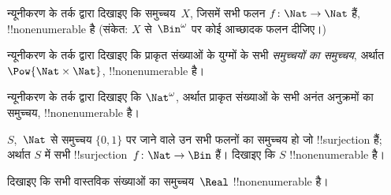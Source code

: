 \documentclass[../../../include/open-logic-section]{subfiles}
\begin{document}
\begin{prob}\label{sfr:siz:red-alt:prob:nat-nat}
  न्यूनीकरण के तर्क द्वारा दिखाइए कि समुच्चय~$X$, जिसमें सभी फलन
  $f\colon \Nat \to \Nat$ हैं, !!{nonenumerable} है (संकेत: $X$
  से~$\Bin^\omega$ पर कोई आच्छादक फलन दीजिए।)
\end{prob}

\begin{prob}
न्यूनीकरण के तर्क द्वारा दिखाइए कि प्राकृत संख्याओं के युग्मों के सभी
\emph{समुच्चयों का समुच्चय}, अर्थात $\Pow{\Nat \times \Nat}$,
!!{nonenumerable} है।
\end{prob}

\begin{prob}
न्यूनीकरण के तर्क द्वारा दिखाइए कि $\Nat^\omega$, अर्थात प्राकृत संख्याओं
के सभी अनंत अनुक्रमों का समुच्चय, !!{nonenumerable} है।
\end{prob}


\begin{prob}
$S$,~$\Nat$ से समुच्चय $\{0,1\}$ पर जाने वाले उन सभी फलनों का समुच्चय हो
जो !!{surjection} हैं; अर्थात $S$ में सभी !!{surjection}~$f \colon \Nat
\to \Bin$ हैं। दिखाइए कि $S$ !!{nonenumerable} है।
\end{prob}

\begin{prob}
दिखाइए कि सभी वास्तविक संख्याओं का समुच्चय~$\Real$ !!{nonenumerable} है।
\end{prob}
\end{document}
